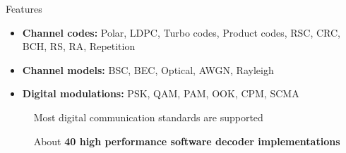 \begin{frame}{Features}
  \vfill
  \begin{itemize}
    \item \textbf{Channel codes:} Polar, LDPC, Turbo codes, Product codes, RSC, CRC, BCH, RS, RA, Repetition
    \vspace{0.1cm}
    \item \textbf{Channel models:} BSC, BEC, Optical, AWGN, Rayleigh
    \vspace{0.1cm}
    \item \textbf{Digital modulations:} PSK, QAM, PAM, OOK, CPM, SCMA
  \end{itemize}
  \vfill
  \pause

  \vspace*{.5em}
  ~~~~~{\color{bleuUni}\Large\MVRightarrow} Most digital communication standards are supported

  \vspace*{.5em}
  ~~~~~{\color{bleuUni}\Large\MVRightarrow} About \textbf{40 high performance software decoder implementations}
  \vfill
\end{frame}

